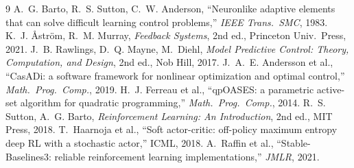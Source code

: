 \documentclass[10pt,twocolumn,a4paper]{article}
\begin{document}
\small
\begin{thebibliography}{9}\setlength{\itemsep}{0pt}
 A.~G. Barto, R.~S. Sutton, C.~W. Anderson, ``Neuronlike adaptive elements that can solve difficult learning control problems,'' \emph{IEEE Trans.\ SMC}, 1983.
 K.~J. \AA str\"om, R.~M. Murray, \emph{Feedback Systems}, 2nd ed., Princeton Univ.\ Press, 2021.
 J.~B. Rawlings, D.~Q. Mayne, M.~Diehl, \emph{Model Predictive Control: Theory, Computation, and Design}, 2nd ed., Nob Hill, 2017.
 J.~A.~E. Andersson et al., ``CasADi: a software framework for nonlinear optimization and optimal control,'' \emph{Math.\ Prog.\ Comp.}, 2019.
 H.~J. Ferreau et al., ``qpOASES: a parametric active-set algorithm for quadratic programming,'' \emph{Math.\ Prog.\ Comp.}, 2014.
 R.~S. Sutton, A.~G. Barto, \emph{Reinforcement Learning: An Introduction}, 2nd ed., MIT Press, 2018.
 T.~Haarnoja et al., ``Soft actor-critic: off-policy maximum entropy deep RL with a stochastic actor,'' ICML, 2018.
 A.~Raffin et al., ``Stable-Baselines3: reliable reinforcement learning implementations,'' \emph{JMLR}, 2021.
\end{thebibliography}
\end{document}
